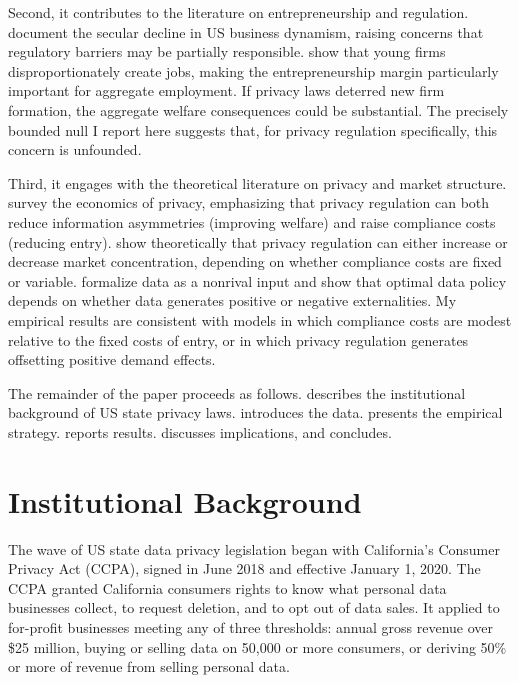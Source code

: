 \documentclass[12pt]{article}
\begin{document}
Second, it contributes to the literature on entrepreneurship and regulation. \citet{decker2014} document the secular decline in US business dynamism, raising concerns that regulatory barriers may be partially responsible. \citet{haltiwanger2013} show that young firms disproportionately create jobs, making the entrepreneurship margin particularly important for aggregate employment. If privacy laws deterred new firm formation, the aggregate welfare consequences could be substantial. The precisely bounded null I report here suggests that, for privacy regulation specifically, this concern is unfounded.

Third, it engages with the theoretical literature on privacy and market structure. \citet{acquisti2016} survey the economics of privacy, emphasizing that privacy regulation can both reduce information asymmetries (improving welfare) and raise compliance costs (reducing entry). \citet{campbell2015} show theoretically that privacy regulation can either increase or decrease market concentration, depending on whether compliance costs are fixed or variable. \citet{jones2020} formalize data as a nonrival input and show that optimal data policy depends on whether data generates positive or negative externalities. My empirical results are consistent with models in which compliance costs are modest relative to the fixed costs of entry, or in which privacy regulation generates offsetting positive demand effects.

The remainder of the paper proceeds as follows.  describes the institutional background of US state privacy laws.  introduces the data.  presents the empirical strategy.  reports results.  discusses implications, and  concludes.


\section{Institutional Background}
\label{sec:background}

The wave of US state data privacy legislation began with California's Consumer Privacy Act (CCPA), signed in June 2018 and effective January 1, 2020. The CCPA granted California consumers rights to know what personal data businesses collect, to request deletion, and to opt out of data sales. It applied to for-profit businesses meeting any of three thresholds: annual gross revenue over \$25 million, buying or selling data on 50,000 or more consumers, or deriving 50\% or more of revenue from selling personal data.
\end{document}
